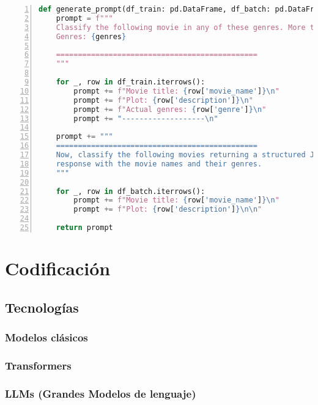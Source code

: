 \documentclass[11pt,spanish,listoffigures,listoftables]{tfgetsinf}
\begin{document}
\begin{lstlisting}[language=Python, basicstyle=\ttfamily\small, frame=single, numbers=left, breaklines=true]
def generate_prompt(df_train: pd.DataFrame, df_batch: pd.DataFrame, genres: str) -> str:
    prompt = f"""
    Classify the following movie in any of these genres. More than one genre can be assigned.
    Genres: {genres}

    ==============================================
    """

    for _, row in df_train.iterrows():
        prompt += f"Movie title: {row['movie_name']}\n"
        prompt += f"Plot: {row['description']}\n"
        prompt += f"Actual genres: {row['genre']}\n"
        prompt += "-------------------\n"

    prompt += """
    ==============================================
    Now, classify the following movies returning a structured JSON
    response with the movie names and their genres.
    """

    for _, row in df_batch.iterrows():
        prompt += f"Movie title: {row['movie_name']}\n"
        prompt += f"Plot: {row['description']}\n\n"

    return prompt
\end{lstlisting}


\mainmatter
\chapter{Codificación}

\section{Tecnologías}

\subsection{Modelos clásicos}

\subsection{Transformers}

\subsection{LLMs (Grandes Modelos de lenguaje)}
\end{document}
